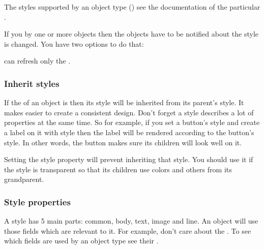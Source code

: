 \documentclass[letterpaper,10pt,english]{sphinxmanual}
\begin{document}
The styles supported by an object type  () see the documentation of the particular {\hyperref[\detokenize{object-types/index::doc}]{}}.

If you  by one or more objects then the objects have to be notified about the style is changed. You have two options to do that:

\begin{sphinxVerbatim}[commandchars=\\\{\}]
    

   
\end{sphinxVerbatim}

 can refresh only the .


\subsubsection{Inherit styles}
\label{\detokenize{overview/styles:inherit-styles}}
If the  of an object is  then its style will be inherited from its parent’s style. It makes easier to create a consistent design. Don’t forget a style describes a lot of properties at the same time. So for example, if you set a button’s style and create a label on it with  style then the label will be rendered according to the button’s style. In other words, the button makes sure its children will look well on it.

Setting the  style property will prevent inheriting that style. You should use it if the style is transparent so that its children use colors and others from its grandparent.


\subsubsection{Style properties}
\label{\detokenize{overview/styles:style-properties}}
A style has 5 main parts: common, body, text, image and line. An object will use those fields which are relevant to it.
For example,  don’t care about the .
To see which fields are used by an object type see their {\hyperref[\detokenize{object-types/index::doc}]{}}.
\end{document}
